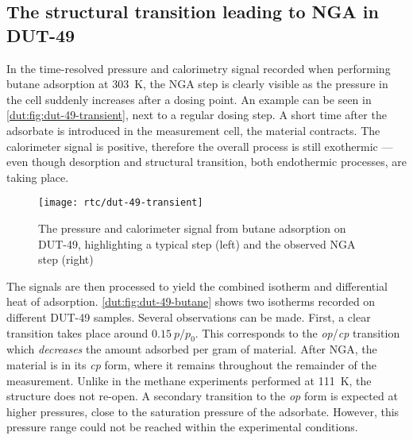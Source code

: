 
\subsection{The structural transition leading to NGA in DUT-49}

In the time-resolved pressure and calorimetry signal recorded when
performing butane adsorption at \SI{303}{\kelvin}, the \gls{NGA} step 
is clearly visible as the pressure in the cell suddenly increases 
after a dosing point. An example can be seen 
in \autoref{dut:fig:dut-49-transient}, next to a regular dosing step.
A short time after the adsorbate is introduced in the measurement
cell, the material contracts. The calorimeter signal is
positive, therefore the overall process is still exothermic --- even
though desorption and structural transition, both endothermic
processes, are taking place.

\begin{figure}[htb]
    \texttt{[image: rtc/dut-49-transient]}%
    \caption{The pressure and calorimeter signal from butane adsorption
    on DUT-49, highlighting a typical step (left) and the 
    observed \gls{NGA} step (right)}%
    \label{dut:fig:dut-49-transient}
\end{figure}

The signals are then processed to yield the combined isotherm and
differential heat of adsorption. \autoref{dut:fig:dut-49-butane} shows
two isotherms recorded on different DUT-49 samples. 
Several observations can be made. First, a clear transition takes place
around \(0.15~p/p_0\). This corresponds to the \textit{op}/\textit{cp} 
transition which \textit{decreases} the amount adsorbed per gram 
of material. After \gls{NGA}, the material is in its \textit{cp} form,
where it remains throughout the remainder of the measurement. 
Unlike in the methane experiments performed at 
\SI{111}{\kelvin}, the structure does not re-open. A secondary 
transition to the \textit{op} form is expected at higher pressures,
close to the saturation pressure of the adsorbate. However, this 
pressure range could not be reached within the experimental conditions.


